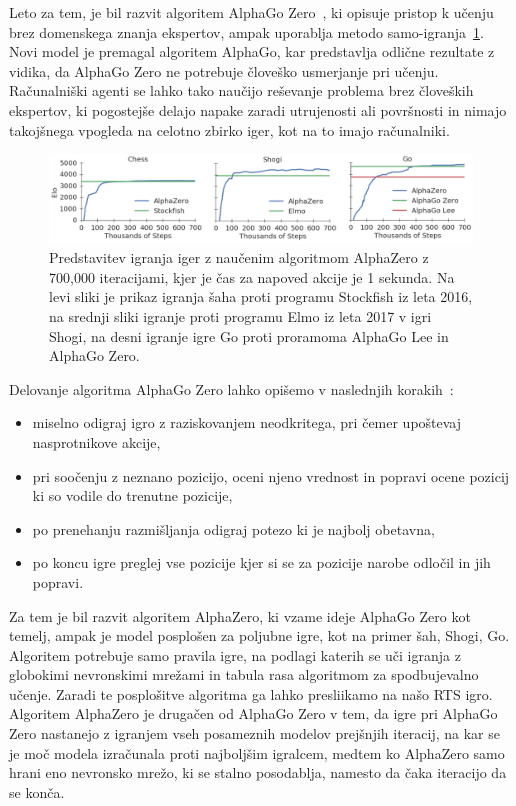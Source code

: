 \documentclass[a4paper, 12pt]{book}
\begin{document}
Leto za tem, je bil razvit algoritem AlphaGo Zero~\cite{silver2017mastering}, ki opisuje pristop k učenju brez domenskega znanja ekspertov, ampak uporablja metodo samo-igranja~\ref{picCompareGo}. 
Novi model je premagal algoritem AlphaGo, kar predstavlja odlične rezultate z vidika, da AlphaGo Zero ne potrebuje človeško usmerjanje pri učenju.
Računalniški agenti se lahko tako naučijo reševanje problema brez človeških ekspertov, ki pogostejše delajo napake zaradi utrujenosti ali površnosti in nimajo takojšnega vpogleda na celotno zbirko iger, kot na to imajo računalniki.

\begin{figure}[h!]
	\begin{center}
		\includegraphics[width=1\textwidth]{photos/go.pdf}
	\end{center}
	\caption{Predstavitev igranja iger z naučenim algoritmom AlphaZero z 700,000 iteracijami, kjer je čas za napoved akcije je 1 sekunda. Na levi sliki je prikaz igranja šaha proti programu Stockfish iz leta 2016, na srednji sliki igranje proti programu Elmo iz leta 2017 v igri Shogi, na desni igranje igre Go proti proramoma AlphaGo Lee in AlphaGo Zero. }
	\label{picCompareGo}
\end{figure}

Delovanje algoritma AlphaGo Zero lahko opišemo v naslednjih korakih~\cite{guid}:
\begin{itemize}
	\item miselno odigraj igro z raziskovanjem neodkritega, pri čemer upoštevaj nasprotnikove akcije,
	\item pri soočenju z neznano pozicijo, oceni njeno vrednost in popravi ocene pozicij ki so vodile do trenutne pozicije,
	\item po prenehanju razmišljanja odigraj potezo ki je najbolj obetavna,
	\item po koncu igre preglej vse pozicije kjer si se za pozicije narobe odločil in jih popravi.
\end{itemize}


Za tem je bil razvit algoritem AlphaZero, ki vzame ideje AlphaGo Zero kot temelj, ampak je model posplošen za poljubne igre, kot na primer šah, Shogi, Go.
Algoritem potrebuje samo pravila igre, na podlagi katerih se uči igranja z globokimi nevronskimi mrežami in tabula rasa algoritmom za spodbujevalno učenje.
Zaradi te posplošitve algoritma ga lahko presliikamo na našo RTS igro.
Algoritem AlphaZero je drugačen od AlphaGo Zero v tem, da igre pri AlphaGo Zero nastanejo z igranjem vseh posameznih modelov prejšnjih iteracij, na kar se je moč modela izračunala proti najboljšim igralcem, medtem ko AlphaZero samo hrani eno nevronsko mrežo, ki se stalno posodablja, namesto da čaka iteracijo da se konča.
\end{document}
